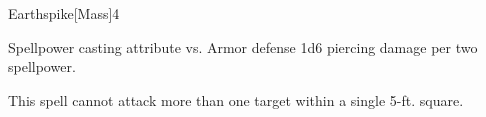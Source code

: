 \begin{spellsection}{Earthspike}[Mass]{4}
    \begin{spellheader}
    \end{spellheader}
    \begin{spellcontent}
        \begin{spelltargetinginfo}
        \end{spelltargetinginfo}
        \begin{spelleffects}
            \begin{spellattack}{Spellpower \add casting attribute vs. Armor defense}
                \spellsuccess 1d6 piercing damage per two spellpower.
            \end{spellattack}
        \end{spelleffects}
    \end{spellcontent}
    \begin{spellfooter}
        \spellnotes This spell cannot attack more than one target within a single 5-ft. square.
        \miscastexplode
    \end{spellfooter}
\end{spellsection}


